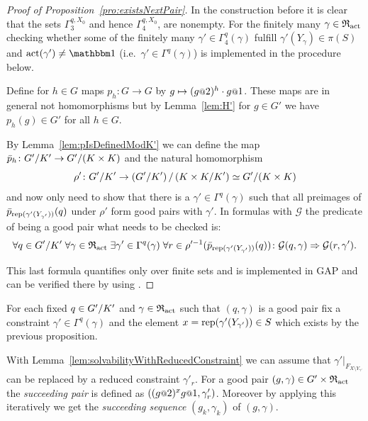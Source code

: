 \documentclass[a4paper,11pt]{amsart}
\begin{document}
\begin{proof}[Proof of Proposition~\ref{pro:existsNextPair}]
 In the construction before it is clear that the sets $\Gamma_3^{q,X_0}$ and hence $\Gamma_4^{q,X_0}$,
 are nonempty. For the finitely many $\gamma\in \mathfrak{R}_{\operatorname{act}}$ checking whether some of the finitely many 
 $\gamma'\in\Gamma_4^{q}(\gamma)$ fulfill 
 $\gamma'(Y_\gamma) \in \pi(S)$ and $\act(\gamma')\neq\id$ 
 (i.e.\ $\gamma' \in\Gamma^{q}(\gamma)$) is implemented in the procedure below.
 
 
  Define for $h\in G$ maps $p_h\colon G\to G$ by 
  $g\mapsto (g\at{2})^{h}\cdot g\at{1}$. These maps are in general not
   homomorphisms but   %
  by Lemma~\ref{lem:H'} for $g\in G'$ we have $p_h(g)\in G'$ for all $h\in G$. 
 
  By Lemma~\ref{lem:pIsDefinedModK'} we can define the map $\bar p_h\colon {G'/K'} \to {G'/(K\times K)}$
 and the natural homomorphism \[\rho'\colon {G'/K'} \to {\left({G'/K'}\right)/\left({K\times K/K'}\right)} \simeq {G'/(K\times K)} \]
 and now only need to show that there is a $\gamma'\in\Gamma^q(\gamma)$ such that all preimages of $\bar p_{\operatorname{rep}(\gamma'(Y_{\gamma'}))}(q)$ under $\rho'$ 
 form good pairs with $\gamma'$. In formulas with $\mathcal{G}$ the predicate of being a good pair what needs to be checked is: 
 \[\forall q\in{G'/K'}\;
      \forall \gamma\in\mathfrak{R}_{\operatorname{act}} \;
	 \exists \gamma'\in \Gamma^q(\gamma)\;
	    \forall r\in \rho'^{-1}(\bar p_{\operatorname{rep}(\gamma'(Y_{\gamma'}))}(q))\colon
	      \mathcal{G}(q,\gamma) \Rightarrow \mathcal{G}(r,\gamma').\]
 
 This last formula quantifies only over finite sets and is implemented in GAP 
 and can be verified there by using . 
 \end{proof}

 \begin{defi}
 For each fixed $q\in{G'/K'}$ and $\gamma\in \mathfrak{R}_{\operatorname{act}}$ such that $(q,\gamma)$ is a good pair
 fix a constraint $\gamma'\in\Gamma^q(\gamma)$ and the element 
 $x=\operatorname{rep}(\gamma'(Y_{\gamma'}))\in S$ which exists by the previous proposition.
 
 With Lemma~\ref{lem:solvabilityWithReducedConstraint} we can assume that $\gamma'|_{F_{X\setminus Y_{\gamma'}}}$ can be replaced by a reduced constraint $\gamma'_r$. 
 For a good pair $(g,\gamma)\in G'\times\mathfrak{R}_{\operatorname{act}}$ the \emph{succeeding pair} is defined as $\left((g\at{2})^xg\at{1},\gamma'_r\right)$.
 Moreover by applying this iteratively we get the \emph{succeeding sequence} $(g_k,\gamma_k)$ of $(g,\gamma)$.
 \end{defi}
\end{document}
